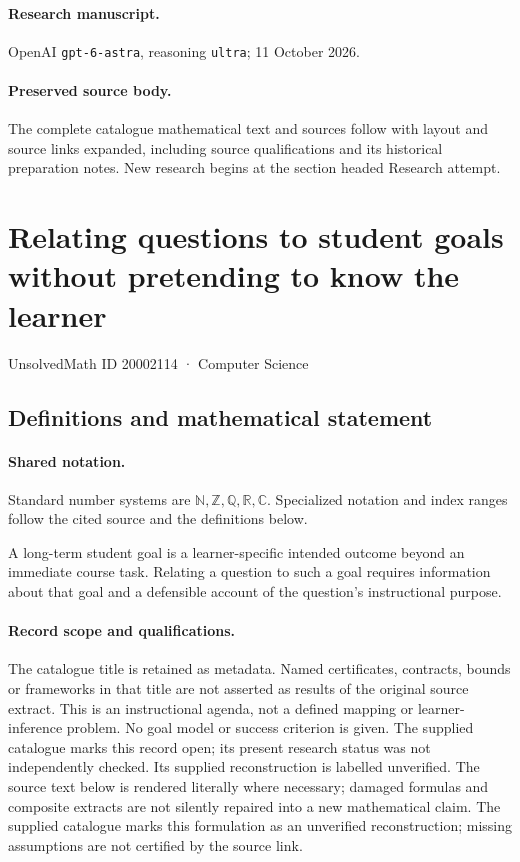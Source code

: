 \documentclass[11pt]{article}
\begin{document}
\paragraph{Research manuscript.} OpenAI \texttt{gpt-6-astra}, reasoning \texttt{ultra}; 11 October 2026.
\paragraph{Preserved source body.} The complete catalogue mathematical text and sources follow with layout and source links expanded, including source qualifications and its historical preparation notes. New research begins at the section headed Research attempt.

\section{Relating questions to student goals without pretending to know the learner}\label{20002114}
{\small UnsolvedMath ID 20002114 · Computer Science}
\subsection{Definitions and mathematical statement}

\paragraph{Shared notation.}Standard number systems are $\mathbb N,\mathbb Z,\mathbb Q,\mathbb R,\mathbb C$. Specialized notation and index ranges follow the cited source and the definitions below.


A long-term student goal is a learner-specific intended outcome beyond an immediate course task. Relating a question to such a goal requires information about that goal and a defensible account of the question's instructional purpose.
\paragraph{Record scope and qualifications.}
The catalogue title is retained as metadata. Named certificates, contracts, bounds or frameworks in that title are not asserted as results of the original source extract.
This is an instructional agenda, not a defined mapping or learner-inference problem. No goal model or success criterion is given. The supplied catalogue marks this record open; its present research status was not independently checked. Its supplied reconstruction is labelled unverified.
The source text below is rendered literally where necessary; damaged formulas and composite extracts are not silently repaired into a new mathematical claim.
The supplied catalogue marks this formulation as an unverified reconstruction; missing assumptions are not certified by the source link.
\end{document}
